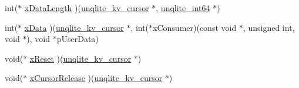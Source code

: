 \begin{DoxyCompactItemize}
\item 
int($\ast$ \hyperlink{structunqlite__kv__methods_a1294a3c4e87589358ba1ada4471a9c2a}{x\-Data\-Length} )(\hyperlink{structunqlite__kv__cursor}{unqlite\-\_\-kv\-\_\-cursor} $\ast$, \hyperlink{unqlite_8c_ae7dd2792142c2ec7874a56602b8f2bb8}{unqlite\-\_\-int64} $\ast$)
\item 
int($\ast$ \hyperlink{structunqlite__kv__methods_a15ce394652fbe105de86b93a63f04053}{x\-Data} )(\hyperlink{structunqlite__kv__cursor}{unqlite\-\_\-kv\-\_\-cursor} $\ast$, int($\ast$x\-Consumer)(const void $\ast$, unsigned int, void $\ast$), void $\ast$p\-User\-Data)
\item 
void($\ast$ \hyperlink{structunqlite__kv__methods_a0c5216e010e240483c1536d0d638f353}{x\-Reset} )(\hyperlink{structunqlite__kv__cursor}{unqlite\-\_\-kv\-\_\-cursor} $\ast$)
\item 
void($\ast$ \hyperlink{structunqlite__kv__methods_adfbe1442892b629325824f5d6293d9a8}{x\-Cursor\-Release} )(\hyperlink{structunqlite__kv__cursor}{unqlite\-\_\-kv\-\_\-cursor} $\ast$)
\end{DoxyCompactItemize}


